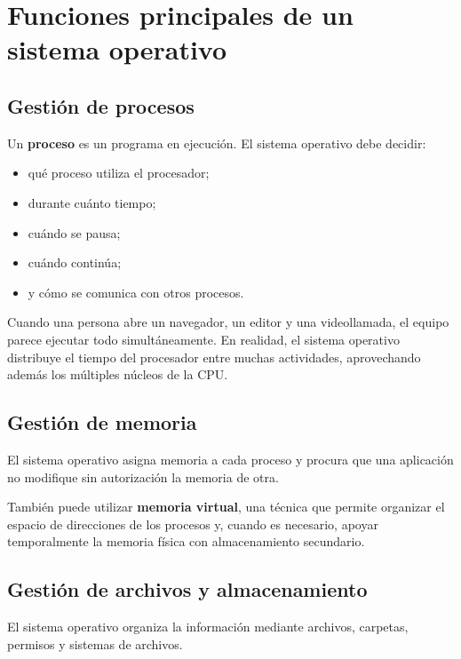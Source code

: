 \documentclass[
  spanish,
  letterpaper,
]{scrbook}
\providecommand{\tightlist}{%
  \setlength{\itemsep}{0pt}\setlength{\parskip}{0pt}}
\begin{document}

\chapter{Funciones principales de un sistema
operativo}\label{funciones-principales-de-un-sistema-operativo}

\section{Gestión de procesos}\label{gestiuxf3n-de-procesos}

Un \textbf{proceso} es un programa en ejecución. El sistema operativo
debe decidir:

\begin{itemize}
\tightlist
\item
  qué proceso utiliza el procesador;
\item
  durante cuánto tiempo;
\item
  cuándo se pausa;
\item
  cuándo continúa;
\item
  y cómo se comunica con otros procesos.
\end{itemize}

Cuando una persona abre un navegador, un editor y una videollamada, el
equipo parece ejecutar todo simultáneamente. En realidad, el sistema
operativo distribuye el tiempo del procesador entre muchas actividades,
aprovechando además los múltiples núcleos de la CPU.

\section{Gestión de memoria}\label{gestiuxf3n-de-memoria}

El sistema operativo asigna memoria a cada proceso y procura que una
aplicación no modifique sin autorización la memoria de otra.

También puede utilizar \textbf{memoria virtual}, una técnica que permite
organizar el espacio de direcciones de los procesos y, cuando es
necesario, apoyar temporalmente la memoria física con almacenamiento
secundario.

\section{Gestión de archivos y
almacenamiento}\label{gestiuxf3n-de-archivos-y-almacenamiento}

El sistema operativo organiza la información mediante archivos,
carpetas, permisos y sistemas de archivos.
\end{document}
